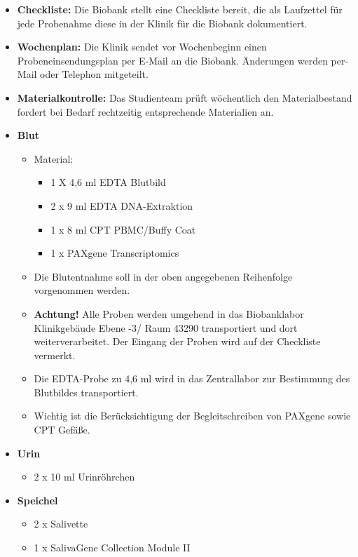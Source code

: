 \begin{itemize}
  \item \textbf{Checkliste:}
    Die Biobank stellt eine Checkliste bereit, die als Laufzettel für
    jede Probenahme diese in der Klinik für die Biobank dokumentiert.
  \item \textbf{Wochenplan:}
    Die Klinik sendet vor Wochenbeginn einen Probeneinsendungsplan per
    E-Mail an die Biobank. Änderungen werden per-Mail oder Telephon
    mitgeteilt.
  \item \textbf{Materialkontrolle:}
    Das Studienteam prüft wöchentlich den Materialbestand fordert bei
    Bedarf rechtzeitig entsprechende Materialien an.
\end{itemize}

\begin{itemize}
  \item \textbf{Blut}
    \begin{itemize}
      \item Material:
        \begin{itemize}
          \item 1 X 4,6 ml EDTA Blutbild
          \item 2 x 9 ml EDTA DNA-Extraktion
          \item 1 x 8 ml CPT PBMC/Buffy Coat
          \item 1 x PAXgene	Transcriptomics
        \end{itemize}
      \item Die Blutentnahme soll in der oben angegebenen Reihenfolge
        vorgenommen werden.
      \item \textbf{Achtung!} Alle Proben werden umgehend in das
        Biobanklabor Klinikgebäude Ebene -3/ Raum 43290 transportiert
        und dort weiterverarbeitet. Der Eingang der Proben wird auf
        der Checkliste vermerkt.
      \item Die EDTA-Probe zu 4,6 ml wird in das Zentrallabor zur
        Bestimmung des Blutbildes transportiert.
      \item Wichtig ist die Berücksichtigung der Begleitschreiben von
        PAXgene sowie CPT Gefäße.
    \end{itemize}
  \item \textbf{Urin}
    \begin{itemize}
      \item 2 x 10 ml Urinröhrchen
    \end{itemize}
  \item \textbf{Speichel}
    \begin{itemize}
      \item 2 x Salivette
      \item 1 x SalivaGene Collection Module II
    \end{itemize}
\end{itemize}

